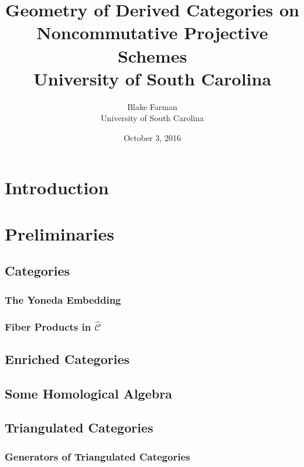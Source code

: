 \documentclass[10pt,draft]{book}
\author{Blake Farman\\University of South Carolina}
\title{
  {Geometry of Derived Categories on Noncommutative Projective Schemes}\\
  {University of South Carolina}
}
\date{October 3, 2016}
\begin{document}
\maketitle

\tableofcontents

\newtheorem{thm}{Theorem}[section]
\newtheorem{lem}[thm]{Lemma}
\newtheorem{cor}[thm]{Corollary}
\newtheorem{prop}[thm]{Proposition}

\theoremstyle{definition}
\newtheorem{defn}[thm]{Definition}
\newtheorem{rmk}[thm]{Remark}
\newtheorem{eg}[thm]{Example}

\chapter{Introduction}
\chapter{Preliminaries}
\section{Categories}

\subsection{The Yoneda Embedding}
\subsection{Fiber Products in $\hat{\mathscr{C}}$} %

\section{Enriched Categories}



\section{Some Homological Algebra}

\section{Triangulated Categories}


\subsection{Generators of Triangulated Categories}

\end{document}
